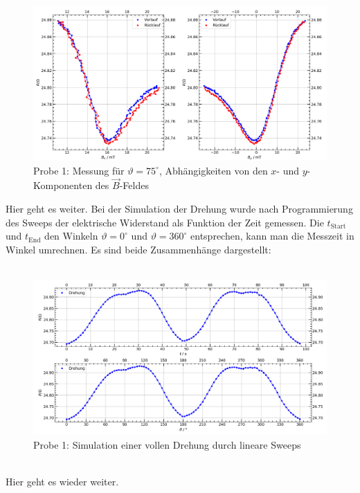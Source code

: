 \documentclass[german,  %
parskip=full,  %
]{scrartcl}
\begin{document}
\begin{figure}[h!]\centering
\includegraphics[width=\textwidth]{Probe1_75_Grad.png}
\caption{Probe 1: Messung für \(\vartheta=75^{\circ}\), Abhängigkeiten von den \(x\)- und \(y\)-Komponenten des \(\vec{B}\)-Feldes}
\end{figure}
\newpage  
Hier geht es weiter.
Bei der Simulation der Drehung wurde nach Programmierung des Sweeps der elektrische Widerstand als Funktion der Zeit gemessen. Die \(t_{\mathrm{Start}}\) und \(t_{\mathrm{End}}\) den Winkeln \(\vartheta = 0^{\circ}\) und \(\vartheta = 360^{\circ}\) entsprechen, kann man die Messzeit in Winkel umrechnen. Es sind beide Zusammenhänge dargestellt: \\\\
\begin{figure}[h!]\centering
\includegraphics[width=\textwidth]{Probe1_Drehung.png}
\caption{Probe 1: Simulation einer vollen Drehung durch lineare Sweeps}
\end{figure}\\
Hier geht es wieder weiter.
\end{document}
